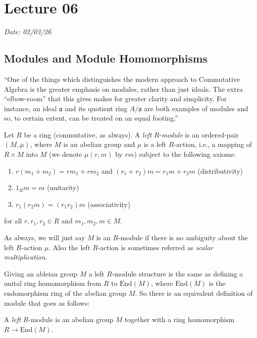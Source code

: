 \chapter{Lecture 06}

\hfill {\footnotesize \textit{Date: 02/03/26}}

\section{Modules and Module Homomorphisms}
``One of the things which distinguishes the modern approach to Commutative Algebra is the greater emphasis on modules, rather than just ideals. The extra ``elbow-room'' that this gives makes for greater clarity and simplicity. For instance, an ideal \(\mathfrak{a}\) and its quotient ring \(A/\mathfrak{a}\) are both examples of modules and so, to certain extent, can be treated on an equal footing.''\cite{AtiyahMacdonald}

\begin{definition}
    Let \(R\) be a ring (commutative, as always). A \emph{left}  \(R\)-\emph{module} is an ordered-pair \((M, \mu)\), where \(M\) is an abelian group and \(\mu\) is a left  \(R\)-action, i.e., a mapping of \(R \times M\) into  \(M\) (we denote \(\mu(r,m)\) by \(rm\)) subject to the following axioms:
    \begin{enumerate}[label=\roman*)]
        \item \(r(m_1 + m_2) = rm_1 + rm_2\) and \((r_1 + r_2) m = r_1 m + r_2 m\) (distributivity)
        \item \(1_Rm = m\) (unitarity)
        \item  \(r_1(r_2m) = (r_1r_2)m\) (associativity)
    \end{enumerate}
for all \(r, r_1, r_2 \in R\) and \(m_1, m_2, m \in M\).
\end{definition}
As always, we will just say \(M\) is an \(R\)-module if there is no ambiguity about the left  \(R\)-action  \(\mu\). Also the left \(R\)-action is sometimes referred as \emph{scalar multiplication}.

Giving an ableian group \(M\) a left  \(R\)-module structure is the same as defining a unital ring homomorphism from \(R\) to  \(\text{End}(M)\), where \(\text{End}(M)\) is the endomorphism ring of the abelian group \(M\). So there is an equivalent definition of module that goes as follows:
\begin{definition}
    A \emph{left} \(R\)-module is an abelian group  \(M\) together with a ring homomorphism  \(R \longrightarrow \text{End}(M)\). 
\end{definition}

